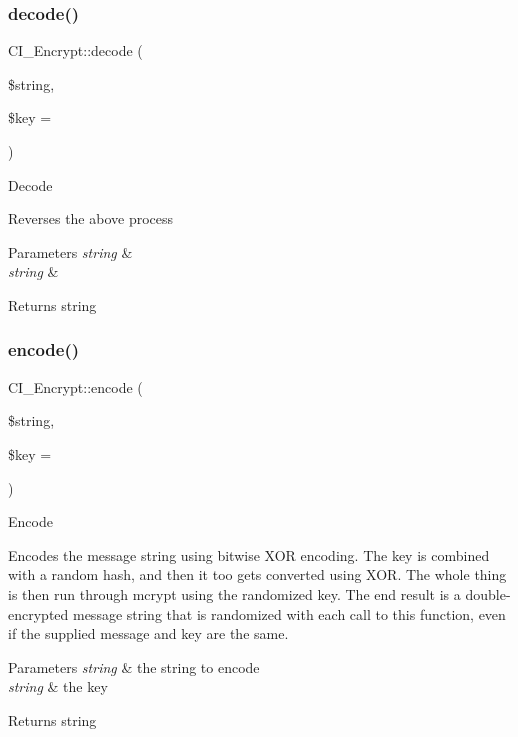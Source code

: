 \subsubsection{\texorpdfstring{decode()}{decode()}}
{\footnotesize\ttfamily C\+I\+\_\+\+Encrypt\+::decode (\begin{DoxyParamCaption}\item[{}]{\$string,  }\item[{}]{\$key = {\ttfamily \textquotesingle{}\textquotesingle{}} }\end{DoxyParamCaption})}

Decode

Reverses the above process


\begin{DoxyParams}{Parameters}
{\em string} & \\
\hline
{\em string} & \\
\hline
\end{DoxyParams}
\begin{DoxyReturn}{Returns}
string 
\end{DoxyReturn}
\mbox{\label{class_c_i___encrypt_ac98c8120dfabdb2c56bca7b1c839842e}} 
\subsubsection{\texorpdfstring{encode()}{encode()}}
{\footnotesize\ttfamily C\+I\+\_\+\+Encrypt\+::encode (\begin{DoxyParamCaption}\item[{}]{\$string,  }\item[{}]{\$key = {\ttfamily \textquotesingle{}\textquotesingle{}} }\end{DoxyParamCaption})}

Encode

Encodes the message string using bitwise X\+OR encoding. The key is combined with a random hash, and then it too gets converted using X\+OR. The whole thing is then run through mcrypt using the randomized key. The end result is a double-\/encrypted message string that is randomized with each call to this function, even if the supplied message and key are the same.


\begin{DoxyParams}{Parameters}
{\em string} & the string to encode \\
\hline
{\em string} & the key \\
\hline
\end{DoxyParams}
\begin{DoxyReturn}{Returns}
string 
\end{DoxyReturn}
\mbox{\label{class_c_i___encrypt_a11669af69e0b813144defd698754fc0b}} 
